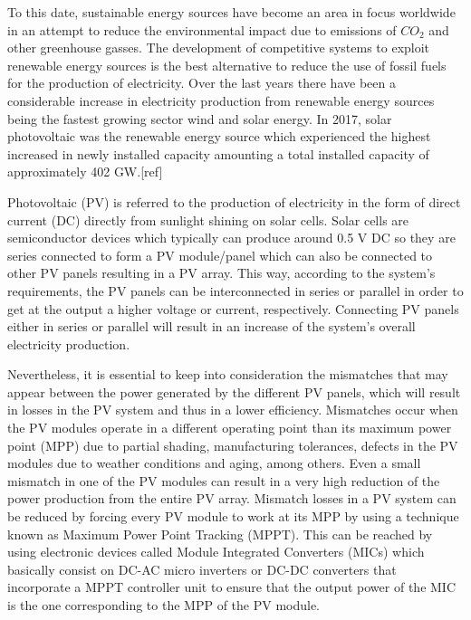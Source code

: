 To this date, sustainable energy sources have become an area in focus worldwide in an attempt to reduce the environmental impact due to emissions of $CO_{2}$ and other greenhouse gasses. The development of competitive systems to exploit renewable energy sources is the best alternative to reduce the use of fossil fuels for the production of electricity. Over the last years there have been a considerable increase in electricity production from renewable energy sources being the fastest growing sector wind and solar energy. In 2017, solar photovoltaic was the renewable energy source which experienced the highest increased in newly installed capacity amounting a total installed capacity of approximately 402 GW.[ref] %

Photovoltaic (PV) is referred to the production of electricity in the form of direct current (DC) directly from sunlight shining on solar cells. Solar cells are semiconductor devices which typically can produce around 0.5 V DC so they are series connected to form a PV module/panel which can also be connected to other PV panels resulting in a PV array. This way, according to the system's requirements, the PV panels can be interconnected in series or parallel in order to get at the output a higher voltage or current, respectively. Connecting PV panels either in series or parallel will result in an increase of the system's overall electricity production.  %

Nevertheless, it is essential to keep into consideration the mismatches that may appear between the power generated by the different PV panels, which will result in losses in the PV system and thus in a lower efficiency. Mismatches occur when the PV modules operate in a different operating point than its maximum power point (MPP) due to partial shading, manufacturing tolerances, defects in the PV modules due to weather conditions and aging, among others. Even a small mismatch in one of the PV modules can result in a very high reduction of the power production from the entire PV array. Mismatch losses in a PV system can be reduced by forcing every PV module to work at its MPP by using a technique known as Maximum Power Point Tracking (MPPT). This can be reached by using electronic devices called Module Integrated Converters (MICs) which basically consist on DC-AC micro inverters or DC-DC converters that incorporate a MPPT controller unit to ensure that the output power of the MIC is the one corresponding to the MPP of the PV module.%

